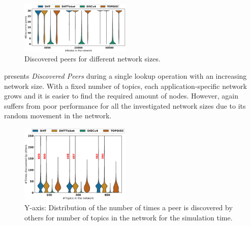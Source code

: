 
\begin{figure}[!h]
\includegraphics[width=0.470\textwidth]{results/no_split/violin_size_discovered.eps}
\caption{Discovered peers for different network sizes.}
\label{fig:discoveredPerSize}
\end{figure}


 presents \emph{Discovered Peers} during a single lookup operation with an increasing network size. With a fixed number of topics, each application-specific network grows and it is easier to find the required amount of nodes. However, \discv again suffers from poor performance for all the investigated network sizes due to its random movement in the network. 

\iffalse %
\begin{figure}
\includegraphics[width=0.470\textwidth]{results/no_split/violin_topic_wasDiscovered.eps}
\caption{Y-axis: Distribution of the number of times a peer is discovered by others for number of topics in the network for the simulation time.}
\label{fig:discoveredByPerTopic}
\end{figure}

